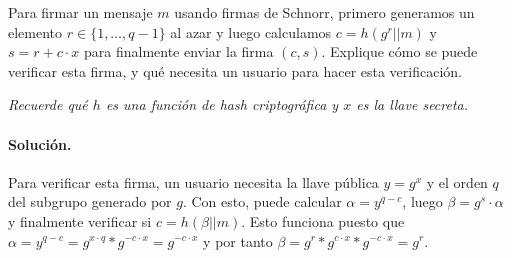 Para firmar un mensaje $m$ usando firmas de Schnorr, primero generamos un elemento $r\in\{1,\ldots,q-1\}$ al azar y luego calculamos $c=h(g^r||m)$ y $s=r+c\cdot x$ para finalmente enviar la firma $(c, s)$.  Explique cómo se puede verificar esta firma, y qué necesita un usuario para hacer esta verificación.

\emph{Recuerde qué $h$ es una función de hash criptográfica y $x$ es la llave secreta.}

\paragraph{Solución.} Para verificar esta firma, un usuario necesita la llave pública $y=g^x$ y el orden $q$ del subgrupo generado por $g$. Con esto, puede calcular $\alpha=y^{q-c}$, luego $\beta=g^s\cdot\alpha$ y finalmente verificar si $c=h(\beta|| m)$. Esto funciona puesto que $\alpha=y^{q-c}=g^{x\cdot q}*g^{-c\cdot x}=g^{-c\cdot x}$ y por tanto $\beta=g^r*g^{c\cdot x}*g^{-c\cdot x}=g^r$.

